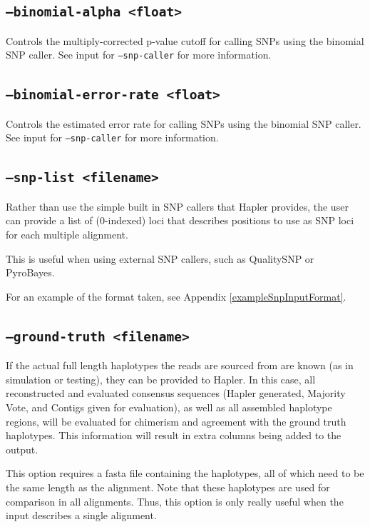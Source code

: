 \documentclass[11pt]{llncs}
\begin{document}
\subsection{\texttt{--binomial-alpha <float>}}

Controls the multiply-corrected p-value cutoff for calling SNPs using the binomial SNP caller. See input for \texttt{--snp-caller} for more information.

\subsection{\texttt{--binomial-error-rate <float>}}

Controls the estimated error rate for calling SNPs using the binomial SNP caller. See input for \texttt{--snp-caller} for more information.

\subsection{\texttt{--snp-list <filename>}}

Rather than use the simple built in SNP callers that Hapler provides, the user can provide a list of (0-indexed) loci that describes positions to
use as SNP loci for each multiple alignment. 

This is useful when using external SNP callers, such as QualitySNP or PyroBayes.

For an example of the format taken, see Appendix \ref{exampleSnpInputFormat}.

\subsection{\texttt{--ground-truth <filename>}}

If the actual full length haplotypes the reads are sourced from are known (as in simulation or testing), they can be provided to Hapler. In this
case, all reconstructed and evaluated consensus sequences (Hapler generated, Majority Vote, and Contigs given for evaluation), as well as all
assembled haplotype regions, will be evaluated for chimerism and agreement with the ground truth haplotypes. This information will result
in extra columns being added to the output.

This option requires a fasta file containing the haplotypes, all of which need to be the same length as the alignment. Note that these haplotypes
are used for comparison in all alignments. Thus, this option is only really useful when the input describes a single alignment.
\end{document}
